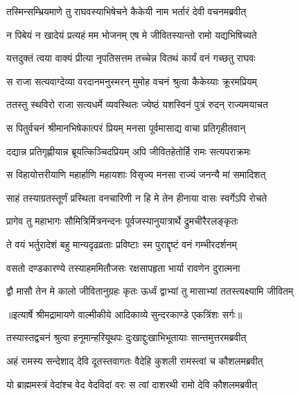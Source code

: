 \twolineshloka
{तस्मिन्सम्भ्रियमाणे तु राघवस्याभिषेचने}
{कैकेयी नाम भर्तारं देवी वचनमब्रवीत्} %

\twolineshloka
{न पिबेयं न खादेयं प्रत्यहं मम भोजनम्}
{एष मे जीवितस्यान्तो रामो यद्यभिषिच्यते} %

\twolineshloka
{यत्तदुक्तं त्वया वाक्यं प्रीत्या नृपतिसत्तम}
{तच्चेन्न वितथं कार्यं वनं गच्छतु राघवः} %

\twolineshloka
{स राजा सत्यवाग्देव्या वरदानमनुस्मरन्}
{मुमोह वचनं श्रुत्वा कैकेय्याः क्रूरमप्रियम्} %

\twolineshloka
{ततस्तु स्थविरो राजा सत्यधर्मे व्यवस्थितः}
{ज्येष्ठं यशस्विनं पुत्रं रुदन् राज्यमयाचत} %

\twolineshloka
{स पितुर्वचनं श्रीमानभिषेकात्परं प्रियम्}
{मनसा पूर्वमासाद्य वाचा प्रतिगृहीतवान्} %

\twolineshloka
{दद्यान्न प्रतिगृह्णीयान्न ब्रूयत्किञ्चिदप्रियम्}
{अपि जीवितहेतोर्हि रामः सत्यपराक्रमः} %

\twolineshloka
{स विहायोत्तरीयाणि महार्हाणि महायशाः}
{विसृज्य मनसा राज्यं जनन्यै मां समादिशत्} %

\twolineshloka
{साहं तस्याग्रतस्तूर्णं प्रस्थिता वनचारिणी}
{न हि मे तेन हीनाया वासः स्वर्गेऽपि रोचते} %

\twolineshloka
{प्रागेव तु महाभागः सौमित्रिर्मित्रनन्दनः}
{पूर्वजस्यानुयात्रार्थे द्रुमचीरैरलङ्कृतः} %

\twolineshloka
{ते वयं भर्तुरादेशं बहु मान्यदृढव्रताः}
{प्रविष्टाः स्म पुराद्दृष्टं वनं गम्भीरदर्शनम्} %

\twolineshloka
{वसतो दण्डकारण्ये तस्याहममितौजसः}
{रक्षसापहृता भार्या रावणेन दुरात्मना} %

\twolineshloka
{द्वौ मासौ तेन मे कालो जीवितानुग्रहः कृतः}
{ऊर्ध्वं द्वाभ्यां तु मासाभ्यां ततस्त्यक्ष्यामि जीवितम्} %


{॥इत्यार्षे श्रीमद्रामायणे वाल्मीकीये आदिकाव्ये सुन्दरकाण्डे एकत्रिंशः सर्गः॥}


\twolineshloka
{तस्यास्तद्वचनं श्रुत्वा हनूमान्हरियूथपः}
{दुःखाद्दुःखाभिभूतायाः सान्तमुत्तरमब्रवीत्} %

\twolineshloka
{अहं रामस्य सन्देशाद् देवि दूतस्तवागतः}
{वैदेहि कुशली रामस्त्वां च कौशलमब्रवीत्} %

\twolineshloka
{यो ब्राह्ममस्त्रं वेदांश्च वेद वेदविदां वरः}
{स त्वां दाशरथी रामो देवि कौशलमब्रवीत्} %

